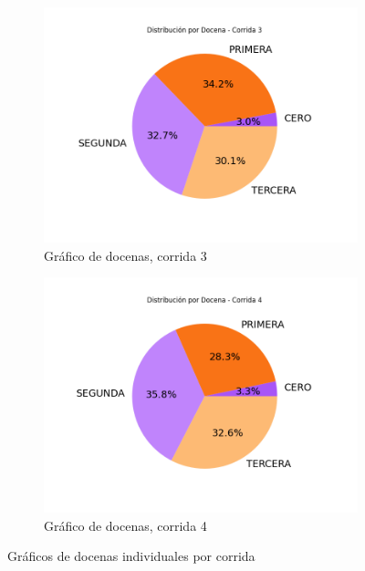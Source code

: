 \documentclass{article}
\begin{document}
\begin{figure}[H]
    \vspace{0.5cm}
    
    \begin{subfigure}[b]{0.45\textwidth}
        \centering
        \includegraphics[width=\textwidth]{Imagenes/GraficoTorta_corrida_3.png}
        \caption{Gráfico de docenas, corrida 3}
    \end{subfigure}
    \hfill
    \begin{subfigure}[b]{0.45\textwidth}
        \centering
        \includegraphics[width=\textwidth]{Imagenes/GraficoTorta_corrida_4.png}
        \caption{Gráfico de docenas, corrida 4}
    \end{subfigure}
    
    \caption{Gráficos de docenas individuales por corrida}
    \label{fig:collage}
\end{figure}
\end{document}
